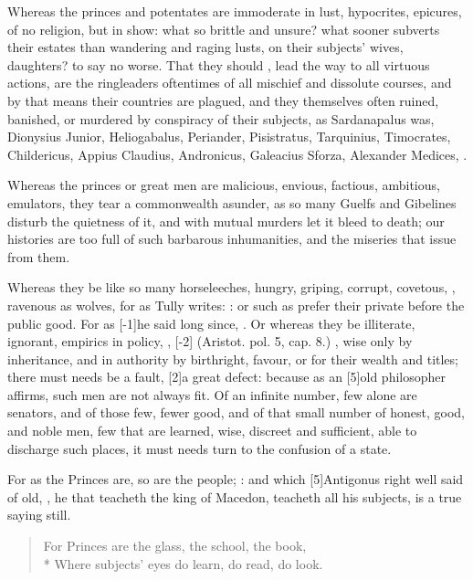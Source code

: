 Whereas the princes and potentates are immoderate in lust, hypocrites,
epicures, of no religion, but in show:  what
so brittle and unsure? what sooner subverts their estates than
wandering and raging lusts, on their subjects' wives, daughters? to say
no worse. That they should , lead the way to all
virtuous actions, are the ringleaders oftentimes of all mischief and
dissolute courses, and by that means their countries are plagued,
and they themselves often ruined, banished, or murdered by
conspiracy of their subjects, as Sardanapalus was, Dionysius Junior,
Heliogabalus, Periander, Pisistratus, Tarquinius, Timocrates,
Childericus, Appius Claudius, Andronicus, Galeacius Sforza, Alexander
Medices, \etc{}.

Whereas the princes or great men are malicious, envious, factious,
ambitious, emulators, they tear a commonwealth asunder, as so many
Guelfs and Gibelines disturb the quietness of it, and with mutual
murders let it bleed to death; our histories are too full of such
barbarous inhumanities, and the miseries that issue from them.

Whereas they be like so many horseleeches, hungry, griping, corrupt,
 covetous, , ravenous as wolves, for as Tully
writes: : or such as prefer their private before the public
good. For as [-1\baselineskip]he said long since, . Or whereas they be illiterate, ignorant, empirics in policy,
, [-2\baselineskip] (Aristot. pol. 5, cap. 8.) ,
wise only by inheritance, and in authority by birthright, favour, or
for their wealth and titles; there must needs be a fault, [2\baselineskip]a great
defect: because as an [5\baselineskip]old philosopher affirms, such men are not
always fit. Of an infinite number, few alone are senators, and of those
few, fewer good, and of that small number of honest, good, and noble
men, few that are learned, wise, discreet and sufficient, able to
discharge such places, it must needs turn to the confusion of a state.

For as the Princes are, so are the people; :
and which [5\baselineskip]Antigonus right well said of old, , he that teacheth the king of
Macedon, teacheth all his subjects, is a true saying still.
%
\begin{verse}
For Princes are the glass, the school, the book,\\*
Where subjects' eyes do learn, do read, do look.
\end{verse}

